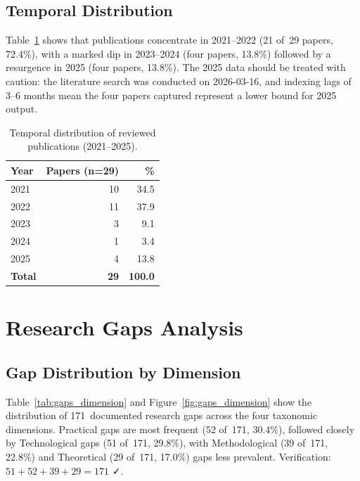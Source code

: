 \documentclass[review,3p]{elsarticle}
\begin{document}
\subsection{Temporal Distribution}
\label{subsec:temporal}

Table~\ref{tab:temporal} shows that publications concentrate in 2021--2022
(21 of~29 papers, 72.4\%), with a marked dip in 2023--2024 (four papers, 13.8\%)
followed by a resurgence in 2025 (four papers, 13.8\%). The 2025 data should be
treated with caution: the literature search was conducted on 2026-03-16, and
indexing lags of 3--6 months mean the four papers captured represent a lower
bound for 2025 output.

\begin{table}[htbp]
\centering
\caption{Temporal distribution of reviewed publications (2021--2025).}
\label{tab:temporal}
\begin{tabular}{lrr}
\toprule
\textbf{Year} & \textbf{Papers (n=29)} & \textbf{\%} \\
\midrule
2021 & 10 & 34.5 \\
2022 & 11 & 37.9 \\
2023 &  3 &  9.1 \\  %
2024 &  1 &  3.4 \\
2025 &  4 & 13.8 \\  %
\midrule
\textbf{Total} & \textbf{29} & \textbf{100.0} \\
\bottomrule
\end{tabular}
\end{table}

\section{Research Gaps Analysis}

\subsection{Gap Distribution by Dimension}
\label{subsec:gap_dimension}

Table~\ref{tab:gaps_dimension} and Figure~\ref{fig:gaps_dimension} show the
distribution of 171~documented research gaps across the four taxonomic
dimensions. Practical gaps are most frequent (52 of~171, 30.4\%), followed
closely by Technological gaps (51 of~171, 29.8\%), with Methodological
(39 of~171, 22.8\%) and Theoretical (29 of~171, 17.0\%) gaps less prevalent.
Verification: $51+52+39+29=171$ ✓.
\end{document}
